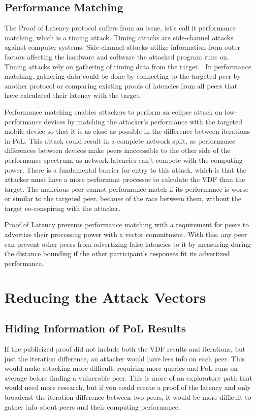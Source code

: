 \subsection{Performance Matching}
The Proof of Latency protocol suffers from an issue, let's call it performance matching, which is a timing attack. Timing attacks are side-channel attacks against computer systems. Side-channel attacks utilize information from outer factors affecting the hardware and software the attacked program runs on. Timing attacks rely on gathering of timing data from the target.~\cite{noauthor_undated-mp} In performance matching, gathering data could be done by connecting to the targeted peer by another protocol or comparing existing proofs of latencies from all peers that have calculated their latency with the target.

Performance matching enables attackers to perform an eclipse attack on low-performance devices by matching the attacker's performance with the targeted mobile device so that it is as close as possible in the difference between iterations in PoL. This attack could result in a complete network split, as performance differences between devices make peers inaccessible to the other side of the performance spectrum, as network latencies can't compete with the computing power. There is a fundamental barrier for entry to this attack, which is that the attacker must have a more performant processor to calculate the VDF than the target. The malicious peer cannot performance match if its performance is worse or similar to the targeted peer, because of the race between them, without the target co-conspiring with the attacker.

Proof of Latency prevents performance matching with a requirement for peers to advertize their processing power with a vector commitment. With this, any peer can prevent other peers from advertizing false latencies to it by measuring during the distance bounding if the other participant's responses fit its advertized performance.

\section{Reducing the Attack Vectors}
\subsection{Hiding Information of PoL Results}
If the publicized proof did not include both the VDF results and iterations, but just the iteration difference, an attacker would have less info on each peer. This would make attacking more difficult, requiring more queries and PoL runs on average before finding a vulnerable peer. This is more of an exploratory path that would need more research, but if you could create a proof of the latency and only broadcast the iteration difference between two peers, it would be more difficult to gather info about peers and their computing performance.

